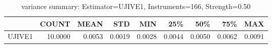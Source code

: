 \begin{table}[ht]
\centering
\caption{variance summary: Estimator=UJIVE1, Instruments=166, Strength=0.50}
\begin{tabular}{lrrrrrrrr}
\toprule
 & COUNT & MEAN & STD & MIN & 25\% & 50\% & 75\% & MAX \\
\midrule
UJIVE1 & 10.0000 & 0.0053 & 0.0019 & 0.0028 & 0.0044 & 0.0050 & 0.0062 & 0.0091 \\
\bottomrule
\end{tabular}
\end{table}
